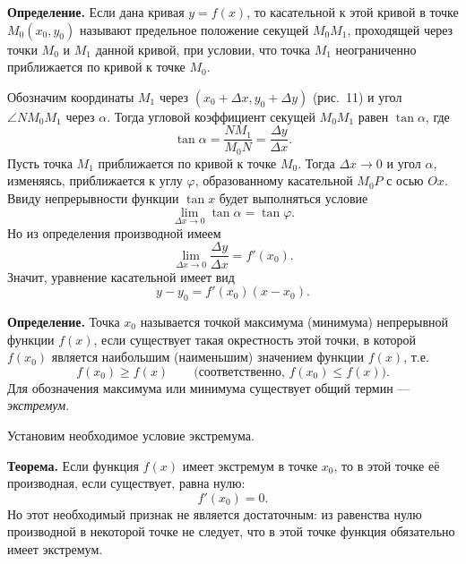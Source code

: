 \begin{rusblock}
\textbf{Определение.} Если дана кривая $y=f(x)$, то касательной к этой кривой в точке $M_0(x_0,y_0)$ называют предельное положение секущей $M_0M_1$, проходящей через точки $M_0$ и $M_1$ данной кривой, при условии, что точка $M_1$ неограниченно приближается по кривой к точке $M_0$.

Обозначим координаты $M_1$ через $(x_0+\Delta x,y_0+\Delta y)$ (рис.~11) и угол $\angle NM_0M_1$ через $\alpha$. Тогда угловой коэффициент секущей $M_0M_1$ равен $\tan\alpha$, где
\[
\tan\alpha=\frac{NM_1}{M_0N}=\frac{\Delta y}{\Delta x}.
\]
Пусть точка $M_1$ приближается по кривой к точке $M_0$. Тогда $\Delta x\to0$ и угол $\alpha$, изменяясь, приближается к углу $\varphi$, образованному касательной $M_0P$ с осью $Ox$. Ввиду непрерывности функции $\tan x$ будет выполняться условие
\[
\lim_{\Delta x\to0}\tan\alpha=\tan\varphi.
\]
Но из определения производной имеем
\[
\lim_{\Delta x\to0}\frac{\Delta y}{\Delta x}=f'(x_0).
\]
Значит, уравнение касательной имеет вид
\[
y-y_0=f'(x_0)(x-x_0).
\]
\end{rusblock}

\begin{rusblock}
\textbf{Определение.} Точка $x_0$ называется точкой максимума (минимума) непрерывной функции $f(x)$, если существует такая окрестность этой точки, в которой $f(x_0)$ является наибольшим (наименьшим) значением функции $f(x)$, т.е.
\[
f(x_0)\ge f(x)\qquad\text{(соответственно, }f(x_0)\le f(x)\text{)}.
\]
Для обозначения максимума или минимума существует общий термин --- \emph{экстремум}.

Установим необходимое условие экстремума.

\textbf{Теорема.} Если функция $f(x)$ имеет экстремум в точке $x_0$, то в этой точке её производная, если существует, равна нулю:
\[
f'(x_0)=0.
\]
Но этот необходимый признак не является достаточным: из равенства нулю производной в некоторой точке не следует, что в этой точке функция обязательно имеет экстремум.
\end{rusblock}

